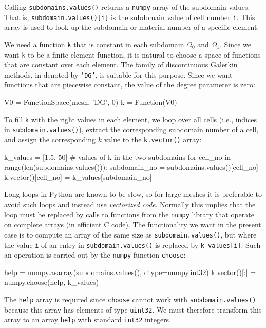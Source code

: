 Calling {\fontsize{10pt}{10pt}\texttt{subdomains.values()}} returns a {\fontsize{10pt}{10pt}\texttt{numpy}} array of the
subdomain values. That is, {\fontsize{10pt}{10pt}\texttt{subdomain.values()[i]}} is
the subdomain value of cell number {\fontsize{10pt}{10pt}\texttt{i}}. This array is used to
look up the subdomain or material number of a specific element.

We need a function {\fontsize{10pt}{10pt}\texttt{k}} that is constant in
each subdomain $\Omega_0$ and $\Omega_1$. Since we want {\fontsize{10pt}{10pt}\texttt{k}}
to be a finite element function, it is natural to choose
a space of functions that are constant over each element.
The family of discontinuous Galerkin methods, in \fenics{} 
denoted by {\fontsize{10pt}{10pt}\texttt{'DG'}}, is suitable for this purpose. Since we
want functions that are piecewise constant, the value of
the degree parameter is zero:
\begin{python}
V0 = FunctionSpace(mesh, 'DG', 0)
k  = Function(V0)
\end{python}
To fill {\fontsize{10pt}{10pt}\texttt{k}} with the right values in each element, we loop over
all cells (i.e., indices in {\fontsize{10pt}{10pt}\texttt{subdomain.values()}}),
extract the corresponding subdomain number of a cell,
and assign the corresponding $k$ value to the {\fontsize{10pt}{10pt}\texttt{k.vector()}} array:
\begin{python}
k_values = [1.5, 50]  # values of k in the two subdomains
for cell_no in range(len(subdomains.values())):
    subdomain_no = subdomains.values()[cell_no]
    k.vector()[cell_no] = k_values[subdomain_no]
\end{python}

Long loops in Python are known to be slow, so for large meshes 
it is preferable to avoid such loops and instead use \emph{vectorized code}.
Normally this implies that the loop must be replaced by
calls to functions from the {\fontsize{10pt}{10pt}\texttt{numpy}} library that operate on complete
arrays (in efficient C code). The functionality we want in the present
case is to compute an array of the same size as
{\fontsize{10pt}{10pt}\verb!subdomain.values()!}, but where the value {\fontsize{10pt}{10pt}\texttt{i}} of an entry
in {\fontsize{10pt}{10pt}\verb!subdomain.values()!} is replaced by {\fontsize{10pt}{10pt}\verb!k_values[i]!}.
Such an operation is carried out by the {\fontsize{10pt}{10pt}\texttt{numpy}} function {\fontsize{10pt}{10pt}\texttt{choose}}:
\begin{python}
help = numpy.asarray(subdomains.values(), dtype=numpy.int32)
k.vector()[:] = numpy.choose(help, k_values)
\end{python}
The {\fontsize{10pt}{10pt}\texttt{help}} array is required since {\fontsize{10pt}{10pt}\texttt{choose}} cannot work with
{\fontsize{10pt}{10pt}\verb!subdomain.values()!} because this array has elements of
type {\fontsize{10pt}{10pt}\texttt{uint32}}. We must therefore transform this array to an array
{\fontsize{10pt}{10pt}\texttt{help}} with standard {\fontsize{10pt}{10pt}\texttt{int32}} integers.

